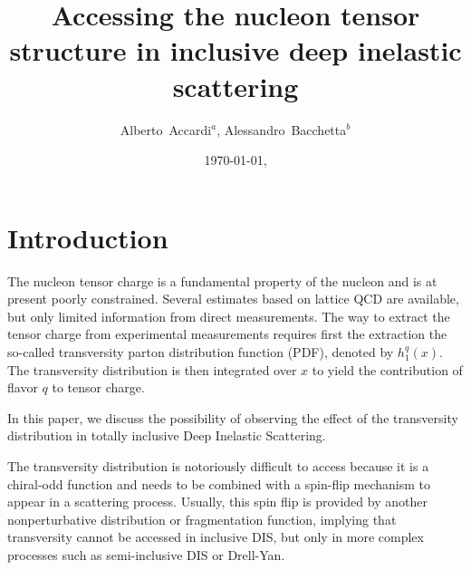 \documentclass[preprintnumbers,floatfix,nofootinbib]{revtex4}
\begin{document}


\title{Accessing the nucleon tensor structure in inclusive deep inelastic scattering} 

\author{Alberto~Accardi$^{a}$, Alessandro~Bacchetta$^{b}$} 

\date{\today, \currenttime}

\begin{abstract}

\end{abstract}



\maketitle


\section{Introduction}

The nucleon tensor charge is a fundamental property of the nucleon and is at
present poorly constrained. Several estimates based on lattice
QCD are available, but only limited information from direct measurements. The
way to extract the tensor charge from experimental measurements requires first
the extraction the so-called transversity parton distribution function (PDF),
denoted by $h_1^q(x)$. The transversity distribution is then integrated over
$x$ to yield the contribution of flavor $q$ to tensor charge.

In this paper, we discuss the possibility of observing the effect of
the transversity distribution in totally inclusive Deep Inelastic Scattering.

The transversity distribution is notoriously difficult to access because it is
a chiral-odd function and needs to be combined with a spin-flip mechanism to
appear in a scattering process. Usually, this spin flip is provided by another
nonperturbative distribution or fragmentation function, implying that
transversity cannot be accessed in inclusive DIS,
but only in more complex processes such as semi-inclusive DIS or Drell-Yan. 
\end{document}
